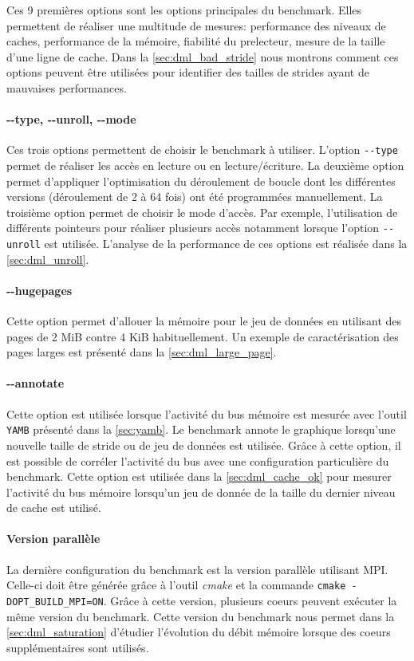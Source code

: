         Ces 9 premières options sont les options principales du benchmark. Elles permettent de réaliser une multitude de mesures: performance des niveaux de caches, performance de la mémoire, fiabilité du \gls{prelecteur}, mesure de la taille d'une ligne de cache. Dans la \autoref{sec:dml_bad_stride} nous montrons comment ces options peuvent être utilisées pour identifier des tailles de strides ayant de mauvaises performances.
    
    
        \paragraph{-{}-type, -{}-unroll, -{}-mode} Ces trois options permettent de choisir le benchmark à utiliser. L'option \verb|--type| permet de réaliser les accès en lecture ou en lecture/écriture. La deuxième option permet d'appliquer l'optimisation du déroulement de boucle dont les différentes versions (déroulement de 2 à 64 fois) ont été programmées manuellement. La troisième option permet de choisir le mode d'accès. Par exemple, l'utilisation de différents pointeurs pour réaliser plusieurs accès notamment lorsque l'option \verb|--unroll| est utilisée. L'analyse de la performance de ces options est réalisée dans la \autoref{sec:dml_unroll}.

        \paragraph{-{}-hugepages} Cette option permet d'allouer la mémoire pour le jeu de données en utilisant des pages de 2 MiB contre 4 KiB habituellement. Un exemple de caractérisation des pages larges est présenté dans la \autoref{sec:dml_large_page}.
        
        \paragraph{-{}-annotate} Cette option est utilisée lorsque l'activité du bus mémoire est mesurée avec l'outil \verb=YAMB= présenté dans la \autoref{sec:yamb}. Le benchmark annote le graphique lorsqu'une nouvelle taille de stride ou de jeu de données est utilisée. Grâce à cette option, il est possible de corréler l'activité du bus avec une configuration particulière du benchmark. Cette option est utilisée dans la \autoref{sec:dml_cache_ok} pour mesurer l'activité du bus mémoire lorsqu'un jeu de donnée de la taille du dernier niveau de cache est utilisé. 

        \paragraph{Version parallèle} La dernière configuration du benchmark est la version parallèle utilisant MPI. Celle-ci doit être générée grâce à l'outil \textit{cmake} et la commande \verb|cmake -DOPT_BUILD_MPI=ON|. Grâce à cette version, plusieurs coeurs peuvent exécuter la même version du benchmark. Cette version du benchmark nous permet dans la \autoref{sec:dml_saturation} d'étudier l'évolution du débit mémoire lorsque des coeurs supplémentaires sont utilisés.
        
